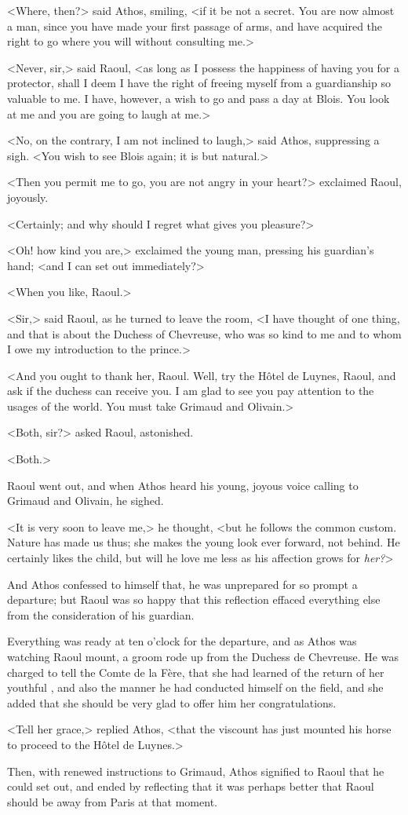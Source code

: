 <Where, then?> said Athos, smiling, <if it be not a secret. You are now almost a man, since you have made your first passage of arms, and have acquired the right to go where you will without consulting me.>

<Never, sir,> said Raoul, <as long as I possess the happiness of having you for a protector, shall I deem I have the right of freeing myself from a guardianship so valuable to me. I have, however, a wish to go and pass a day at Blois. You look at me and you are going to laugh at me.>

<No, on the contrary, I am not inclined to laugh,> said Athos, suppressing a sigh. <You wish to see Blois again; it is but natural.>

<Then you permit me to go, you are not angry in your heart?> exclaimed Raoul, joyously.

<Certainly; and why should I regret what gives you pleasure?>

<Oh! how kind you are,> exclaimed the young man, pressing his guardian's hand; <and I can set out immediately?>

<When you like, Raoul.>

<Sir,> said Raoul, as he turned to leave the room, <I have thought of one thing, and that is about the Duchess of Chevreuse, who was so kind to me and to whom I owe my introduction to the prince.>

<And you ought to thank her, Raoul. Well, try the Hôtel de Luynes, Raoul, and ask if the duchess can receive you. I am glad to see you pay attention to the usages of the world. You must take Grimaud and Olivain.>

<Both, sir?> asked Raoul, astonished.

<Both.>

Raoul went out, and when Athos heard his young, joyous voice calling to Grimaud and Olivain, he sighed.

<It is very soon to leave me,> he thought, <but he follows the common custom. Nature has made us thus; she makes the young look ever forward, not behind. He certainly likes the child, but will he love me less as his affection grows for \emph{her?}>

And Athos confessed to himself that, he was unprepared for so prompt a departure; but Raoul was so happy that this reflection effaced everything else from the consideration of his guardian.

Everything was ready at ten o'clock for the departure, and as Athos was watching Raoul mount, a groom rode up from the Duchess de Chevreuse. He was charged to tell the Comte de la Fère, that she had learned of the return of her youthful , and also the manner he had conducted himself on the field, and she added that she should be very glad to offer him her congratulations.

<Tell her grace,> replied Athos, <that the viscount has just mounted his horse to proceed to the Hôtel de Luynes.>

Then, with renewed instructions to Grimaud, Athos signified to Raoul that he could set out, and ended by reflecting that it was perhaps better that Raoul should be away from Paris at that moment. 